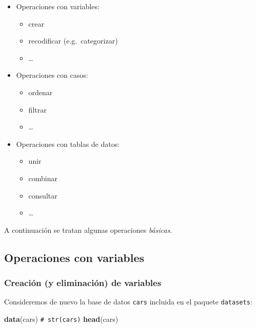 \documentclass[
]{book}
\newenvironment{Shaded}{\begin{snugshade}}{\end{snugshade}}
\newcommand{\CommentTok}[1]{\textcolor[rgb]{0.56,0.35,0.01}{\textit{#1}}}
\newcommand{\FunctionTok}[1]{\textcolor[rgb]{0.13,0.29,0.53}{\textbf{#1}}}
\newcommand{\NormalTok}[1]{#1}
\providecommand{\tightlist}{%
  \setlength{\itemsep}{0pt}\setlength{\parskip}{0pt}}
\theoremstyle{break}
\theoremstyle{nonumberplain}
\renewcommand{\CommentTok}[1]{\textcolor[rgb]{0.41,0.41,0.41}{\texttt{#1}}}
\begin{document}
\begin{itemize}
\tightlist
\item
  Operaciones con variables:

  \begin{itemize}
  \tightlist
  \item
    crear
  \item
    recodificar (e.g.~categorizar)
  \item
    \ldots{}
  \end{itemize}
\item
  Operaciones con casos:

  \begin{itemize}
  \tightlist
  \item
    ordenar
  \item
    filtrar
  \item
    \ldots{}
  \end{itemize}
\item
  Operaciones con tablas de datos:

  \begin{itemize}
  \tightlist
  \item
    unir
  \item
    combinar
  \item
    consultar
  \item
    \ldots{}
  \end{itemize}
\end{itemize}

A continuación se tratan algunas operaciones \emph{básicas}.

\subsection{Operaciones con variables}\label{operaciones-con-variables}

\subsubsection{Creación (y eliminación) de variables}\label{creaciuxf3n-y-eliminaciuxf3n-de-variables}

Consideremos de nuevo la base de datos \texttt{cars} incluida en el paquete \texttt{datasets}:

\begin{Shaded}
\begin{Highlighting}[]
\FunctionTok{data}\NormalTok{(cars)}
\CommentTok{\# str(cars)}
\FunctionTok{head}\NormalTok{(cars)}
\end{Highlighting}
\end{Shaded}
\end{document}
